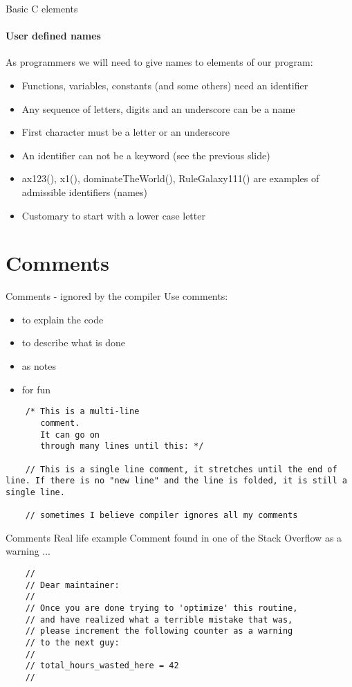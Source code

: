\documentclass[10pt]{beamer}
\begin{document}
\begin{frame}{Basic C elements}
  \framesubtitle{User defined names}
  \centering
  As programmers we will need to give names to elements of our program:
  \vspace*{10pt}
  
  \begin{itemize}
    \item Functions, variables, constants (and some others) need an identifier
    \item Any sequence of letters, digits and an underscore can be a name
    \item First character must be a letter or an underscore
    \item An identifier can not be a keyword (see the previous slide)
    \item ax123(), x1(), dominateTheWorld(), RuleGalaxy111() are examples of admissible identifiers (names)
    \item Customary to start with a lower case letter
  \end{itemize}
\end{frame}

\section{Comments}

\begin{frame}[fragile]{Comments - ignored by the compiler}
    Use comments:
    \begin{itemize}
      \item to explain the code
      \item to describe what is done
      \item as notes
      \item for fun
    \end{itemize}
    \begin{lstlisting}
    /* This is a multi-line
       comment.
       It can go on
       through many lines until this: */
   
    // This is a single line comment, it stretches until the end of line. If there is no "new line" and the line is folded, it is still a single line.
   
    // sometimes I believe compiler ignores all my comments
    \end{lstlisting}
\end{frame}

\begin{frame}[fragile]{Comments Real life example}
  Comment found in one of the Stack Overflow as a warning ...
 
  \begin{lstlisting}
    //
    // Dear maintainer:
    //
    // Once you are done trying to 'optimize' this routine,
    // and have realized what a terrible mistake that was,
    // please increment the following counter as a warning
    // to the next guy:
    //
    // total_hours_wasted_here = 42
    //
  \end{lstlisting}
\end{frame}
\end{document}
